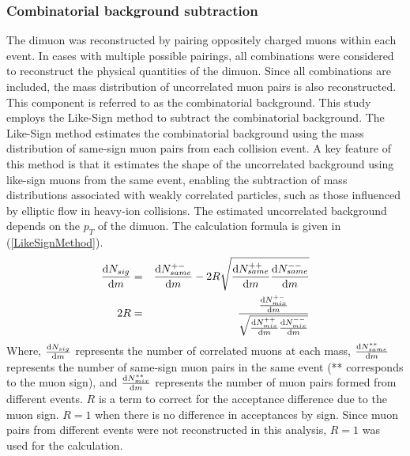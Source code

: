             \subsubsection{Combinatorial background subtraction}
            \label{Analysis:Dimuon:Combinatorial BG subtraction}
                The dimuon was reconstructed by pairing oppositely charged muons within each event. In cases with multiple possible pairings, all combinations were considered to reconstruct the physical quantities of the dimuon. Since all combinations are included, the mass distribution of uncorrelated muon pairs is also reconstructed. This component is referred to as the combinatorial background. This study employs the Like-Sign method to subtract the combinatorial background. The Like-Sign method estimates the combinatorial background using the mass distribution of same-sign muon pairs from each collision event. A key feature of this method is that it estimates the shape of the uncorrelated background using like-sign muons from the same event, enabling the subtraction of mass distributions associated with weakly correlated particles, such as those influenced by elliptic flow in heavy-ion collisions. The estimated uncorrelated background depends on the $p_T$ of the dimuon. The calculation formula is given in (\ref{LikeSignMethod}).
                \begin{eqnarray}
                    \label{LikeSignMethod}
                    \dv{N_{sig}}{m} &=& \dv{N_{same}^{+-}}{m} - 2R \sqrt{\dv{N_{same}^{++}}{m} \dv{N_{same}^{--}}{m}}\\
                    2R &=& \frac{\dv{N_{mix}^{+-}}{m}}{\sqrt{\dv{N_{mix}^{++}}{m} \dv{N_{mix}^{--}}{m}}} 
                \end{eqnarray}
                Where, $\dv{N_{sig}}{m}$ represents the number of correlated muons at each mass, $\dv{N_{same}^{**}}{m}$ represents the number of same-sign muon pairs in the same event (** corresponds to the muon sign), and $\dv{N_{mix}^{**}}{m}$ represents the number of muon pairs formed from different events. $R$ is a term to correct for the acceptance difference due to the muon sign. $R = 1$ when there is no difference in acceptances by sign. Since muon pairs from different events were not reconstructed in this analysis, $R = 1$ was used for the calculation.

